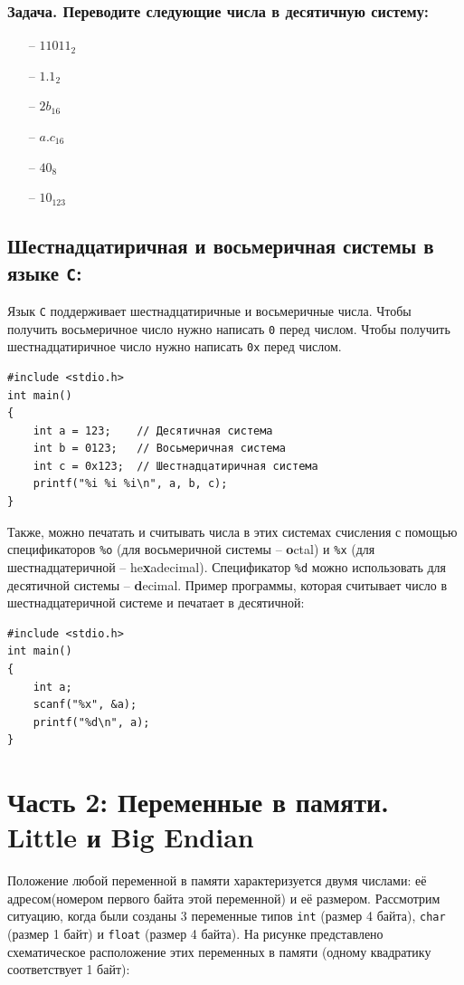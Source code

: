 \documentclass{article}
\begin{document}
\subsubsection*{Задача. Переводите следующие числа в десятичную систему:}
\begin{multicols}{3}
\begin{itemize}
\item[--] $11011_2$
\item[--] $1.1_2$
\item[--] $2b_{16}$
\item[--] $a.c_{16}$
\item[--] $40_{8}$
\item[--] $10_{123}$
\end{itemize}
\end{multicols}

\subsection*{Шестнадцатиричная и восьмеричная системы в языке \texttt{C}:}
Язык \texttt{C} поддерживает шестнадцатиричные и восьмеричные числа. Чтобы получить восьмеричное число нужно написать \texttt{0} перед числом. Чтобы получить шестнадцатиричное число нужно написать \texttt{0x} перед числом.
\begin{lstlisting}
#include <stdio.h>
int main() 
{
    int a = 123;    // Десятичная система
    int b = 0123;   // Восьмеричная система
    int c = 0x123;  // Шестнадцатиричная система
    printf("%i %i %i\n", a, b, c);
}
\end{lstlisting}
Также, можно печатать и считывать числа в этих системах счисления с помощью спецификаторов \texttt{\%o} (для восьмеричной системы -- \textbf{o}ctal) и \texttt{\%x} (для шестнадцатеричной -- he\textbf{x}adecimal). Спецификатор \texttt{\%d} можно использовать для десятичной системы -- \textbf{d}ecimal. Пример программы, которая считывает число в шестнадцатеричной системе и печатает в десятичной:
\begin{lstlisting}
#include <stdio.h>
int main() 
{
    int a;
    scanf("%x", &a);
    printf("%d\n", a);
}
\end{lstlisting}
\newpage
\section*{Часть 2: Переменные в памяти. Little и Big Endian}
Положение любой переменной в памяти характеризуется двумя числами: её адресом(номером первого байта этой переменной) и её размером. Рассмотрим ситуацию, когда были созданы 3 переменные типов \texttt{int} (размер 4 байта), \texttt{char} (размер 1 байт) и \texttt{float} (размер 4 байта).
На рисунке представлено схематическое расположение этих переменных в памяти (одному квадратику соответствует 1 байт):
\end{document}
